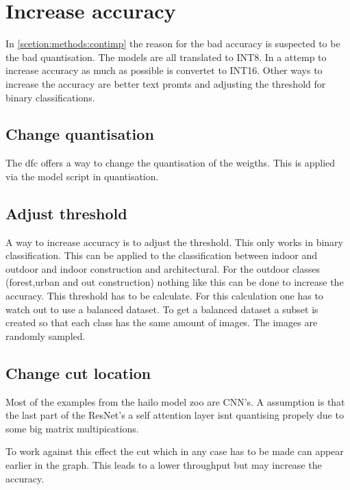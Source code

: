 \section{Increase accuracy}

In \cref{scetion:methods:contimp} the reason for the bad accuracy is suspected to be the bad quantisation.
The models are all translated to INT8.
In a attemp to increase accuracy as much as possible is convertet to INT16.
Other ways to increase the accuracy are better text promts and adjusting the threshold for binary classifications.


\subsection{Change quantisation}

The \acrshort{dfc} offers a way to change the quantisation of the weigths.
This is applied via the model script in quantisation.


\subsection{Adjust threshold}

A way to increase accuracy is to adjust the threshold.
This only works in binary classification.
This can be applied to the classification between indoor and outdoor and indoor construction and architectural.
For the outdoor classes (forest,urban and out construction) nothing like this can be done to increase the accuracy.
This threshold has to be calculate.
For this calculation one has to watch out to use a balanced dataset.
To get a balanced dataset a subset is created so that each class has the same amount of images.
The images are randomly sampled.

\subsection{Change cut location}
Most of the examples from the hailo model zoo\cite{hailo_model_zoo} are CNN's.
A assumption is that the last part of the ResNet's a self attention layer isnt quantising propely due to some big matrix multipications.

To work against this effect the cut which in any case has to be made can appear earlier in the graph.
This leads to a lower throughput but may increase the accuracy.